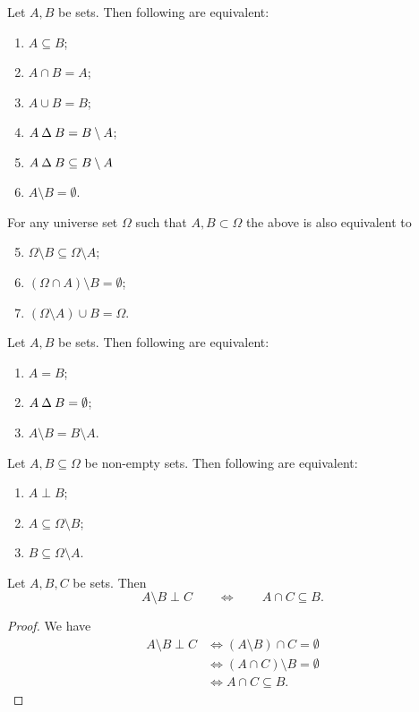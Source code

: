 \begin{lemma} \label{inclusionCriteria}
Let $A,B$ be sets. Then following are equivalent:
\begin{enumerate}
\item $A\subseteq B$;
\item $A\cap B = A$;
\item $A\cup B = B$;
\item $A\mathbin{\Delta} B = B\setminus A$;
\item $A\mathbin{\Delta} B \subseteq B\setminus A$
\item $A\setminus B = \emptyset$.
\end{enumerate}
For any universe set $\Omega$ such that $A,B\subset \Omega$ the above is also equivalent to
\begin{enumerate}\setcounter{enumi}{4}
\item $\Omega\setminus B \subseteq \Omega\setminus A$;
\item $(\Omega\cap A)\setminus B = \emptyset$;
\item $(\Omega\setminus A)\cup B = \Omega$.
\end{enumerate}
\end{lemma}
\begin{corollary}
Let $A,B$ be sets. Then following are equivalent:
\begin{enumerate}
\item $A=B$;
\item $A\mathbin{\Delta} B = \emptyset$;
\item $A\setminus B = B\setminus A$.
\end{enumerate}
\end{corollary}
\begin{corollary} \label{setPerpInequality}
Let $A,B\subseteq \Omega$ be non-empty sets. Then following are equivalent:
\begin{enumerate}
\item $A\perp B$;
\item $A \subseteq \Omega\setminus B$;
\item $B \subseteq \Omega\setminus A$.
\end{enumerate}
\end{corollary}

\begin{lemma} \label{disjointSetDifference}
Let $A,B,C$ be sets. Then
\[ A\setminus B \perp C \qquad\iff\qquad A\cap C \subseteq B. \]
\end{lemma}
\begin{proof}
We have
\begin{align*}
A\setminus B \perp C &\iff (A\setminus B) \cap C = \emptyset \\
&\iff (A\cap C)\setminus B = \emptyset \\
&\iff A\cap C \subseteq B.
\end{align*}
\end{proof}

